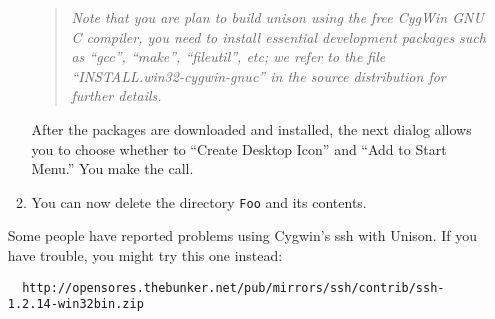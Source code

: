 \documentclass{article}
\begin{document}
\begin{enumerate}
\begin{enumerate}
  \begin{quote} \em Note that you are plan to build unison using the free
    CygWin GNU C compiler, you need to install essential development
    packages such as ``gcc'', ``make'', ``fileutil'', etc; we refer to
    the file ``INSTALL.win32-cygwin-gnuc'' in the source distribution
    for further details.
  \end{quote}

  After the packages are downloaded and installed, the next dialog
  allows you to choose whether to ``Create Desktop Icon'' and ``Add to
  Start Menu.''  You make the call.
\item You can now delete the directory \verb|Foo| and its contents.
\end{enumerate}
Some people have reported problems using Cygwin's ssh with Unison.  If
you have trouble, you might try this one instead:
\begin{verbatim}
  http://opensores.thebunker.net/pub/mirrors/ssh/contrib/ssh-1.2.14-win32bin.zip
\end{verbatim}


\end{enumerate}
\end{document}
